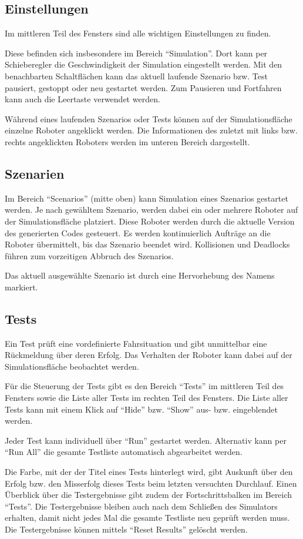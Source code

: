 \subsection{Einstellungen}
\label{subsec:settings}

Im mittleren Teil des Fensters sind alle wichtigen Einstellungen zu finden.

Diese befinden sich insbesondere im Bereich \enquote{Simulation}. 
Dort kann per Schieberegler die Geschwindigkeit der Simulation eingestellt werden. 
Mit den benachbarten Schaltflächen kann das aktuell laufende Szenario bzw. Test pausiert, gestoppt oder neu gestartet werden. 
Zum Pausieren und Fortfahren kann auch die Leertaste verwendet werden.

Während eines laufenden Szenarios oder Tests können auf der Simulationsfläche einzelne Roboter angeklickt werden. 
Die Informationen des zuletzt mit links bzw. rechts angeklickten Roboters werden im unteren Bereich dargestellt.


\subsection{Szenarien}
\label{subsec:scenarios}

Im Bereich \enquote{Scenarios} (mitte oben) kann Simulation eines Szenarios gestartet werden. 
Je nach gewähltem Szenario, werden dabei ein oder mehrere Roboter auf der Simulationsfläche platziert.
Diese Roboter werden durch die aktuelle Version des generierten Codes gesteuert. 
Es werden kontinuierlich Aufträge an die Roboter übermittelt, bis das Szenario beendet wird. 
Kollisionen und Deadlocks führen zum vorzeitigen Abbruch des Szenarios.

Das aktuell ausgewählte Szenario ist durch eine Hervorhebung des Namens markiert.


\subsection{Tests}
\label{subsec:tests}


Ein Test prüft eine vordefinierte Fahrsituation und gibt unmittelbar eine Rückmeldung über deren Erfolg. 
Das Verhalten der Roboter kann dabei auf der Simulationsfläche beobachtet werden.

Für die Steuerung der Tests gibt es den Bereich \enquote{Tests} im mittleren Teil des Fensters sowie die Liste aller Tests im rechten Teil des Fensters. 
Die Liste aller Tests kann mit einem Klick auf \enquote{Hide} bzw. \enquote{Show} aus- bzw. eingeblendet werden.

Jeder Test kann individuell über \enquote{Run} gestartet werden. 
Alternativ kann per \enquote{Run All} die gesamte Testliste automatisch abgearbeitet werden.

Die Farbe, mit der der Titel eines Tests hinterlegt wird, gibt Auskunft über den Erfolg bzw. den Misserfolg dieses Tests beim letzten versuchten Durchlauf. 
Einen Überblick über die Testergebnisse gibt zudem der Fortschrittsbalken im Bereich \enquote{Tests}. 
Die Testergebnisse bleiben auch nach dem Schließen des Simulators erhalten, damit nicht jedes Mal die gesamte Testliste neu geprüft werden muss. 
Die Testergebnisse können mittels \enquote{Reset Results} gelöscht werden.

